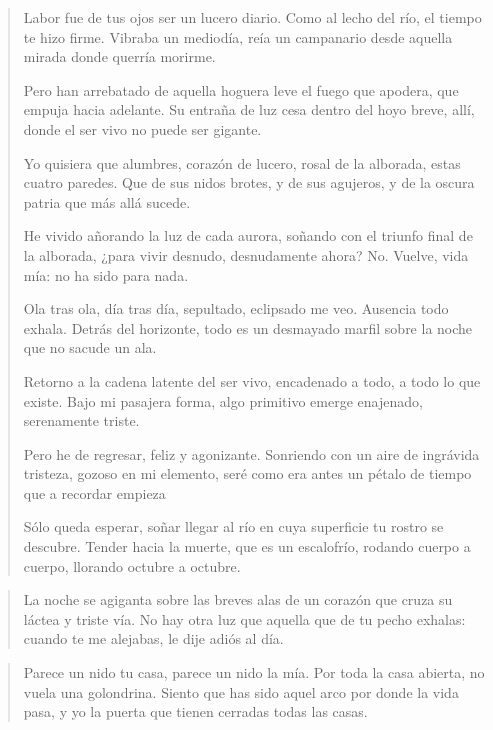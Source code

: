 \documentclass[a4paper, 12pt]{article}
\begin{document}
\begin{verse}

Labor fue de tus ojos ser un lucero diario.
Como al lecho del río, el tiempo te hizo firme.
Vibraba un mediodía, reía un campanario
desde aquella mirada donde querría morirme.

Pero han arrebatado de aquella hoguera leve
el fuego que apodera, que empuja hacia adelante.
Su entraña de luz cesa dentro del hoyo breve,
allí, donde el ser vivo no puede ser gigante.

Yo quisiera que alumbres, corazón de lucero,
rosal de la alborada, estas cuatro paredes.
Que de sus nidos brotes, y de sus agujeros,
y de la oscura patria que más allá sucede.

He vivido añorando la luz de cada aurora,
soñando con el triunfo final de la alborada,
¿para vivir desnudo, desnudamente ahora?
No. Vuelve, vida mía: no ha sido para nada.

Ola tras ola, día tras día, sepultado,
eclipsado me veo. Ausencia todo exhala.
Detrás del horizonte, todo es un desmayado
marfil sobre la noche que no sacude un ala.

Retorno a la cadena latente del ser vivo,
encadenado a todo, a todo lo que existe.
Bajo mi pasajera forma, algo primitivo
emerge enajenado, serenamente triste.

Pero he de regresar, feliz y agonizante.
Sonriendo con un aire de ingrávida tristeza,
gozoso en mi elemento, seré como era antes
un pétalo de tiempo que a recordar empieza

Sólo queda esperar, soñar llegar al río
en cuya superficie tu rostro se descubre.
Tender hacia la muerte, que es un escalofrío,
rodando cuerpo a cuerpo, llorando octubre a octubre.



\end{verse}

\pagebreak 

\begin{verse}
La noche se agiganta sobre las breves alas
de un corazón que cruza su láctea y triste vía.
No hay otra luz que aquella que de tu pecho exhalas:
cuando te me alejabas, le dije adiós al día.
\end{verse}
\pagebreak 


\begin{verse}
Parece un nido tu casa,
parece un nido la mía.
Por toda la casa abierta,
no vuela una golondrina.
Siento que has sido aquel arco
por donde la vida pasa,
y yo la puerta que tienen
cerradas todas las casas.
\end{verse}
\end{document}
